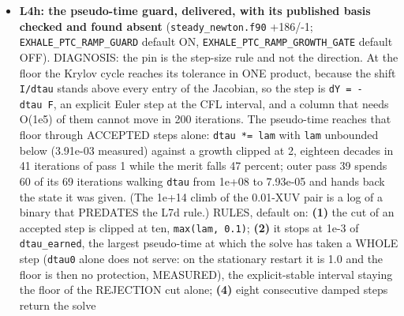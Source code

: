 \documentclass[english,a4paper]{my_memo}
\begin{document}
\begin{itemize}
  false stagnation counts disappear and every number and the ending are
  unchanged; on \texttt{carrier\_model\_a\_newton} the ending is the same (the budget of
  20, two active equations refusing) and the iterate is not -\/- the old measure
  halves the bound at pass 7 and ends at \texttt{trust} 2.5e-03 with a smaller worst
  carrier row (5.75e-04 at cell 500) than the new one (5.21e-03 at cell 248),
  which is not an argument for it: a carrier held still by its own bound
  perturbs its balance row less, and that circularity is what the correction
  removes. R3: the worst carrier-drift cell (\texttt{carrier\_drift\_location}), the
  cell holding the particle-count bound (\texttt{bound\_last\_j}) and the worst-residual
  cell (\texttt{carrier\_steady\_residual}) are logged apart every pass and are three
  DIFFERENT cells -\/- 333, 327 and 373 at pass 7 of \texttt{carrier\_model\_a\_newton},
  with the row that refuses the certification naming a fourth.
\item
  \textbf{L4h: the pseudo-time guard, delivered, with its published basis checked and
  found absent} (\texttt{steady\_newton.f90} +186/-1; \texttt{EXHALE\_PTC\_RAMP\_GUARD} default
  ON, \texttt{EXHALE\_PTC\_RAMP\_GROWTH\_GATE} default OFF). DIAGNOSIS: the pin is the
  step-size rule and not the direction. At the floor the Krylov cycle reaches
  its tolerance in ONE product, because the shift \texttt{I/dtau} stands above every
  entry of the Jacobian, so the step is \texttt{dY\ =\ -dtau\ F}, an explicit Euler step
  at the CFL interval, and a column that needs O(1e5) of them cannot move in
  200 iterations. The pseudo-time reaches that floor through ACCEPTED steps
  alone: \texttt{dtau\ *=\ lam} with \texttt{lam} unbounded below (3.91e-03 measured) against a
  growth clipped at 2, eighteen decades in 41 iterations of pass 1 while the
  merit falls 47 percent; outer pass 39 spends 60 of its 69 iterations walking
  \texttt{dtau} from 1e+08 to 7.93e-05 and hands back the state it was given. (The
  1e+14 climb of the 0.01-XUV pair is a log of a binary that PREDATES the L7d
  rule.) RULES, default on: \textbf{(1)} the cut of an accepted step is clipped at
  ten, \texttt{max(lam,\ 0.1)}; \textbf{(2)} it stops at 1e-3 of \texttt{dtau\_earned}, the largest
  pseudo-time at which the solve has taken a WHOLE step (\texttt{dtau0} alone does not
  serve: on the stationary restart it is 1.0 and the floor is then no
  protection, MEASURED), the explicit-stable interval staying the floor of the
  REJECTION cut alone; \textbf{(4)} eight consecutive damped steps return the solve

\end{itemize}
\end{document}
